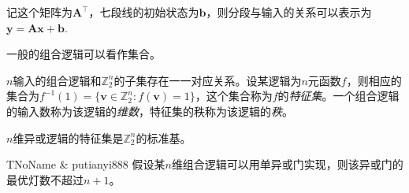 \begin{example}{}{}
	
	
	记这个矩阵为$\mathbf{A}^\top$，七段线的初始状态为$\mathbf{b}$，则分段与输入的关系可以表示为$\mathbf{y}=\mathbf{A}\mathbf{x}+\mathbf{b}$.
	
\end{example}

一般的组合逻辑可以看作集合。
\begin{definition}{}{}
	$n$输入的组合逻辑和$\mathbb{Z}_2^n$的子集存在一一对应关系。设某逻辑为$n$元函数$f$，则相应的集合为$f^{-1}(1)=\{\mathbf{v}\in\mathbb{Z}_2^n:f(\mathbf{v})=1\}$，这个集合称为$f$的\emph{特征集}。一个组合逻辑的输入数称为该逻辑的\emph{维数}，特征集的秩称为该逻辑的\emph{秩}。
\end{definition}
\begin{example}{}{}
	$n$维异或逻辑的特征集是$\mathbb{Z}_2^n$的标准基。
\end{example}
\begin{theorem}{TNoName \& putianyi888}{}
	假设某$n$维组合逻辑可以用单异或门实现，则该异或门的最优灯数不超过$n+1$。
\end{theorem}

